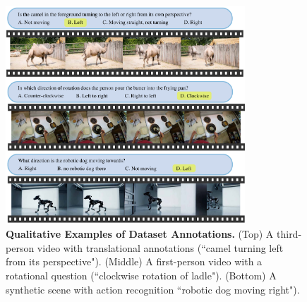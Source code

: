 \begin{figure}[t]
    \centering
    \includegraphics[width=0.8\textwidth]{figures/dataset_qualitative_v3.pdf}
    \caption{\textbf{Qualitative Examples of Dataset Annotations.} (Top) A third-person video with translational annotations (``camel turning left from its perspective"). (Middle) A first-person video with a rotational question (``clockwise rotation of ladle"). (Bottom) A synthetic scene with action recognition ``robotic dog moving right"). }
    \label{fig:qualitative_examples}
    \vspace{-0.5cm}
\end{figure}